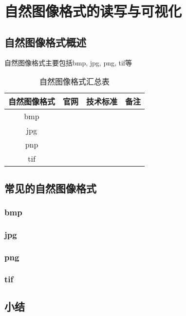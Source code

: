 

\chapter{自然图像格式的读写与可视化}
\section{自然图像格式概述}
自然图像格式主要包括bmp, jpg, png, tif等
\begin{table}[H]
    \centering
    \begin{tabular}{c|c|c|c}
        \hline 
         自然图像格式 & 官网 & 技术标准 & 备注  \\
        \hline
         bmp & & & \\ 
         jpg & & & \\ 
         pnp & & & \\ 
         tif & & & \\ 
        \hline
    \end{tabular}
    \caption{自然图像格式汇总表}
    \label{tab:2-1}
\end{table}


\section{常见的自然图像格式}
\subsection{bmp}
\subsection{jpg}
\subsection{png}
\subsection{tif}
\section{小结}

